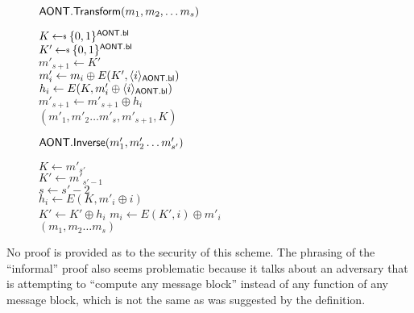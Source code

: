\documentclass[11pt,twoside]{article}
\begin{document}
\begin{figure}[h]
{
\underline{$\mathsf{AONT.Transform}(m_1,m_2,\dots m_s)$}

\begin{algorithm}[H]
$K\getsr \bits^\schemefont{AONT.bl}$\\
$K'\getsr \bits^\schemefont{AONT.bl}$\\
$m'_{s+1}\gets K'$\\
{
$m'_i\gets m_i \oplus E(K',\langle i \rangle_{\mathsf{AONT.bl}})$\\
$h_i\gets E(K,m'_i\oplus \langle i \rangle_{\mathsf{AONT.bl}})$\\
$m'_{s+1}\gets m'_{s+1}\oplus h_i$\\
}
\Return $(m'_1,m'_2\dots m'_s, m'_{s+1}, K)$
\end{algorithm}
}
{
\underline{$\mathsf{AONT.Inverse}(m'_1,m'_2\dots m'_{s'})$}

\begin{algorithm}[H]
$K\gets m'_{s'}$\\
$K'\gets m'_{s'-1}$\\
$s\gets s'-2$\\
{
$h_i\gets E(K,m'_i\oplus i)$\\
$K'\gets K'\oplus h_i$
}
{
$m_i\gets E(K',i)\oplus m'_i$\\
}
\Return $(m_1,m_2\dots m_{s})$
\end{algorithm}
}
\end{figure} 
\pagebreak
No proof is provided as to the security of this scheme. The phrasing of the ``informal'' proof also seems problematic because it talks about an adversary that is attempting to ``compute any message block'' instead of any function of any message block, which is not the same as was suggested by the definition.

\appendix
\end{document}
